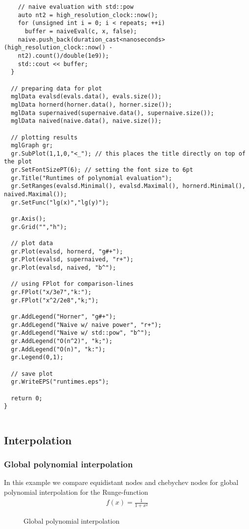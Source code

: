 \documentclass[a4paper]{article}
\begin{document}
\begin{verbatim}
    // naive evaluation with std::pow
    auto nt2 = high_resolution_clock::now();
    for (unsigned int i = 0; i < repeats; ++i)
      buffer = naiveEval(c, x, false);
    naive.push_back(duration_cast<nanoseconds>(high_resolution_clock::now() - 
    nt2).count()/double(1e9));
    std::cout << buffer;
  }

  // preparing data for plot
  mglData evalsd(evals.data(), evals.size());
  mglData hornerd(horner.data(), horner.size());
  mglData supernaived(supernaive.data(), supernaive.size());
  mglData naived(naive.data(), naive.size());

  // plotting results
  mglGraph gr;
  gr.SubPlot(1,1,0,"<_"); // this places the title directly on top of the plot
  gr.SetFontSizePT(6); // setting the font size to 6pt 
  gr.Title("Runtimes of polynomial evaluation");
  gr.SetRanges(evalsd.Minimal(), evalsd.Maximal(), hornerd.Minimal(), naived.Maximal());
  gr.SetFunc("lg(x)","lg(y)");
  
  gr.Axis();
  gr.Grid("","h");
 
  // plot data
  gr.Plot(evalsd, hornerd, "g#+");
  gr.Plot(evalsd, supernaived, "r+");
  gr.Plot(evalsd, naived, "b^");

  // using FPlot for comparison-lines
  gr.FPlot("x/3e7","k:");
  gr.FPlot("x^2/2e8","k;");

  gr.AddLegend("Horner", "g#+");
  gr.AddLegend("Naive w/ naive power", "r+");
  gr.AddLegend("Naive w/ std::pow", "b^");
  gr.AddLegend("O(n^2)", "k;");
  gr.AddLegend("O(n)", "k:");
  gr.Legend(0,1);

  // save plot
  gr.WriteEPS("runtimes.eps");
  
  return 0;
}
 
\end{verbatim}


\subsection{Interpolation}

\subsubsection{Global polynomial interpolation}

In this example we compare equidistant nodes and chebychev nodes for global polynomial interpolation for the Runge-function 
\begin{align}
  f(x) = \frac{1}{1 + x^2}
\end{align}
\begin{figure}[hb]
     \caption{Global polynomial interpolation}
\end{figure}
\end{document}
